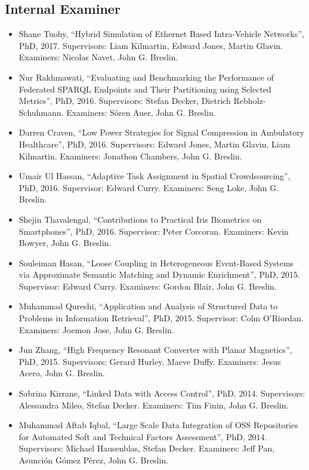 \documentclass[10pt,a4paper]{res} %
\begin{document}
\begin{resume}
\subsection*{Internal Examiner}

\begin{itemize} \itemsep -2pt
\item Shane Tuohy, ``Hybrid Simulation of Ethernet Based Intra-Vehicle Networks'', PhD, 2017. Supervisors: Liam Kilmartin, Edward Jones, Martin Glavin. Examiners: Nicolas Navet, John G. Breslin.
\item Nur Rakhmawati, ``Evaluating and Benchmarking the Performance of Federated SPARQL Endpoints and Their Partitioning using Selected Metrics'', PhD, 2016. Supervisors: Stefan Decker, Dietrich Rebholz-Schuhmann. Examiners: S\"{o}ren Auer, John G. Breslin.
\item Darren Craven, ``Low Power Strategies for Signal Compression in Ambulatory Healthcare'', PhD, 2016. Supervisors: Edward Jones, Martin Glavin, Liam Kilmartin. Examiners: Jonathon Chambers, John G. Breslin.
\item Umair Ul Hassan, ``Adaptive Task Assignment in Spatial Crowdsourcing'', PhD, 2016. Supervisor: Edward Curry. Examiners: Seng Loke, John G. Breslin.
\item Shejin Thavalengal, ``Contributions to Practical Iris Biometrics on Smartphones'', PhD, 2016. Supervisor: Peter Corcoran. Examiners: Kevin Bowyer, John G. Breslin.
\item Souleiman Hasan, ``Loose Coupling in Heterogeneous Event-Based Systems via Approximate Semantic Matching and Dynamic Enrichment'', PhD, 2015. Supervisor: Edward Curry. Examiners: Gordon Blair, John G. Breslin.
\item Muhammad Qureshi, ``Application and Analysis of Structured Data to Problems in Information Retrieval'', PhD, 2015. Supervisor: Colm O'Riordan. Examiners: Joemon Jose, John G. Breslin.
\item Jun Zhang, ``High Frequency Resonant Converter with Planar Magnetics'', PhD, 2015. Supervisors: Gerard Hurley, Maeve Duffy. Examiners: Jesus Acero, John G. Breslin.
\item Sabrina Kirrane, ``Linked Data with Access Control'', PhD, 2014. Supervisors: Alessandra Mileo, Stefan Decker. Examiners: Tim Finin, John G. Breslin.
\item Muhammad Aftab Iqbal, ``Large Scale Data Integration of OSS Repositories for Automated Soft and Technical Factors Assessment'', PhD, 2014. Supervisors: Michael Hausenblas, Stefan Decker. Examiners: Jeff Pan, Asunci\'{o}n G\'{o}mez P\'{e}rez, John G. Breslin.

\end{itemize}
\end{resume}
\end{document}
